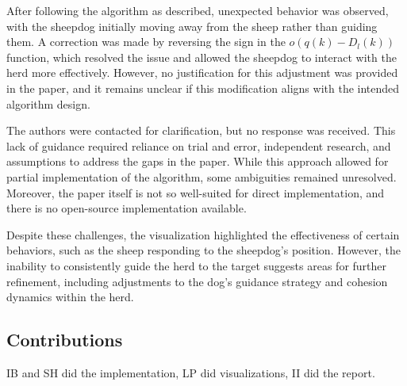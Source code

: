 \documentclass[9pt]{pnas-new}
\begin{document}
After following the algorithm as described, unexpected behavior was observed, with the sheepdog initially moving away from the sheep rather than guiding them. A correction was made by reversing the sign in the \(o(q(k) - D_l(k))\) function, which resolved the issue and allowed the sheepdog to interact with the herd more effectively. However, no justification for this adjustment was provided in the paper, and it remains unclear if this modification aligns with the intended algorithm design.

The authors were contacted for clarification, but no response was received. This lack of guidance required reliance on trial and error, independent research, and assumptions to address the gaps in the paper. While this approach allowed for partial implementation of the algorithm, some ambiguities remained unresolved. Moreover, the paper itself is not so well-suited for direct implementation, and there is no open-source implementation available.

Despite these challenges, the visualization highlighted the effectiveness of certain behaviors, such as the sheep responding to the sheepdog’s position. However, the inability to consistently guide the herd to the target suggests areas for further refinement, including adjustments to the dog’s guidance strategy and cohesion dynamics within the herd.




\subsection*{Contributions}
IB and SH did the implementation, LP did visualizations, II did the report.

\begin{multicols}{2}
\section*{\bibname}

\end{multicols}
\end{document}
